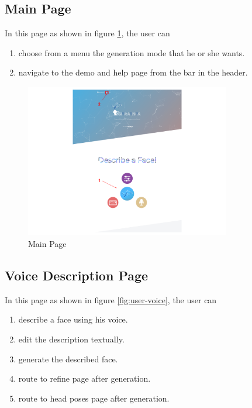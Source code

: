 \subsection{Main Page}
In this page as shown in figure \ref{fig:user-main}, the user can 

\begin{enumerate}
    \item choose from a menu the generation mode that he or she wants.
    \item navigate to the demo and help page from the bar in the header.
\end{enumerate}
    
\begin{figure}[H]
    \centering
    \includegraphics[width=0.8\textwidth]{images/guide/main.png}
    \caption{Main Page}
    \label{fig:user-main}
\end{figure}


\subsection{Voice Description Page}
In this page as shown in figure \ref{fig:user-voice}, the user can 

\begin{enumerate}
    \item describe a face using his voice.
    \item edit the description textually.
    \item generate the described face.
    \item route to refine page after generation.
    \item route to head poses page after generation.
\end{enumerate}

